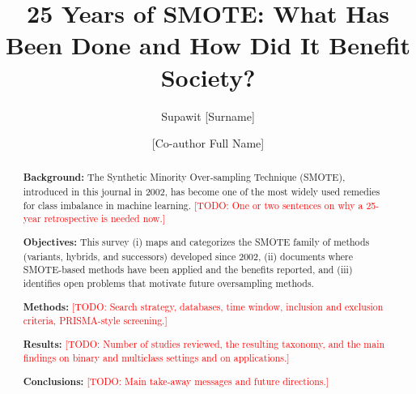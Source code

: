 \documentclass[manuscript, screen, review]{jair}
\newcommand{\TODO}[1]{\textcolor{red}{[TODO: #1]}}
\begin{document}
\title[25 Years of SMOTE]{25 Years of SMOTE: What Has Been Done and How Did It Benefit Society?}

\author{Supawit [Surname]}

\author{[Co-author Full Name]}

\renewcommand{\shortauthors}{[Surname] \& [Co-author Surname]}

\begin{abstract}
{\bf Background:}
The Synthetic Minority Over-sampling Technique (SMOTE), introduced in this journal in 2002, has become one of the most widely used remedies for class imbalance in machine learning. \TODO{One or two sentences on why a 25-year retrospective is needed now.}

{\bf Objectives:}
This survey (i) maps and categorizes the SMOTE family of methods (variants, hybrids, and successors) developed since 2002, (ii) documents where SMOTE-based methods have been applied and the benefits reported, and (iii) identifies open problems that motivate future oversampling methods.

{\bf Methods:}
\TODO{Search strategy, databases, time window, inclusion and exclusion criteria, PRISMA-style screening.}

{\bf Results:}
\TODO{Number of studies reviewed, the resulting taxonomy, and the main findings on binary and multiclass settings and on applications.}

{\bf Conclusions:}
\TODO{Main take-away messages and future directions.}
\end{abstract}

\end{document}
